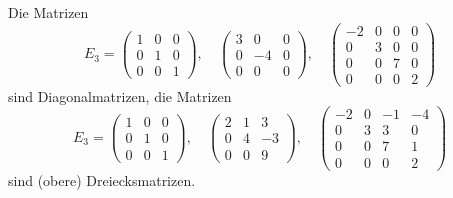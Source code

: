 \begin{beispiel} Die Matrizen
 $$ E_3 = \left( \begin{matrix} 1 & 0 & 0 \\ 0 & 1 & 0 \\ 0 & 0 & 1 \end{matrix} \right), 
 \quad  \left( \begin{matrix} 3 & 0 & 0 \\ 0 & -4 & 0 \\ 0 & 0 & 0 \end{matrix} \right), 
 \quad  \left( \begin{matrix} -2 & 0 & 0 & 0 \\ 0 & 3 & 0 & 0 \\ 0 & 0 & 7 & 0 \\
  0 & 0 & 0 & 2 \end{matrix} \right) $$  
sind Diagonalmatrizen, die Matrizen
 $$ E_3 = \left( \begin{matrix} 1 & 0 & 0 \\ 0 & 1 & 0 \\ 0 & 0 & 1 \end{matrix} \right), 
 \quad  \left( \begin{matrix} 2 & 1 & 3 \\ 0 & 4 & -3 \\ 0 & 0 & 9 \end{matrix} \right), 
 \quad  \left( \begin{matrix} -2 & 0 & -1 & -4 \\ 0 & 3 & 3 & 0 \\ 0 & 0 & 7 & 1 \\
  0 & 0 & 0 & 2 \end{matrix} \right) $$  
sind (obere) Dreiecksmatrizen.
\end{beispiel}

\bigbreak

